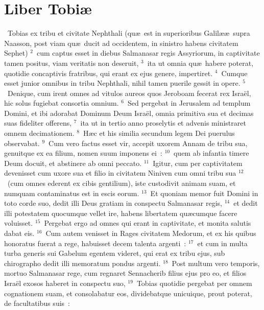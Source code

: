{\centering \section*{Liber Tobiæ}}\thispagestyle{empty}

~Tobias ex tribu et civitate Nephthali (qu\ae\ est in superioribus Galil\ae \ae\ supra Naasson, post viam qu\ae\ ducit ad occidentem, in sinistro habens civitatem Sephet)
${}^{2}$~cum captus esset in diebus Salmanasar regis Assyriorum, in captivitate tamen positus, viam veritatis non deseruit,
${}^{3}$~ita ut omnia qu\ae\ habere poterat, quotidie concaptivis fratribus, qui erant ex ejus genere, impertiret.
${}^{4}$~Cumque esset junior omnibus in tribu Nephthali, nihil tamen puerile gessit in opere.
${}^{5}$~Denique, cum irent omnes ad vitulos aureos quos Jeroboam fecerat rex Isra\"el, hic solus fugiebat consortia omnium.
${}^{6}$~Sed pergebat in Jerusalem ad templum Domini, et ibi adorabat Dominum Deum Isra\"el, omnia primitiva sua et decimas suas fideliter offerens,
${}^{7}$~ita ut in tertio anno proselytis et advenis ministraret omnem decimationem.
${}^{8}$~H\ae c et his similia secundum legem Dei puerulus observabat.
${}^{9}$~Cum vero factus esset vir, accepit uxorem Annam de tribu sua, genuitque ex ea filium, nomen suum imponens ei~:
${}^{10}$~quem ab infantia timere Deum docuit, et abstinere ab omni peccato.
${}^{11}$~Igitur, cum per captivitatem devenisset cum uxore sua et filio in civitatem Niniven cum omni tribu sua
${}^{12}$~(cum omnes ederent ex cibis gentilium), iste custodivit animam suam, et numquam contaminatus est in escis eorum.
${}^{13}$~Et quoniam memor fuit Domini in toto corde suo, dedit illi Deus gratiam in conspectu Salmanasar regis,
${}^{14}$~et dedit illi potestatem quocumque vellet ire, habens libertatem qu\ae cumque facere voluisset.
${}^{15}$~Pergebat ergo ad omnes qui erant in captivitate, et monita salutis dabat eis.
${}^{16}$~Cum autem venisset in Rages civitatem Medorum, et ex his quibus honoratus fuerat a rege, habuisset decem talenta argenti~:
${}^{17}$~et cum in multa turba generis sui Gabelum egentem videret, qui erat ex tribu ejus, sub chirographo dedit illi memoratum pondus argenti.
${}^{18}$~Post multum vero temporis, mortuo Salmanasar rege, cum regnaret Sennacherib filius ejus pro eo, et filios Isra\"el exosos haberet in conspectu suo,
${}^{19}$~Tobias quotidie pergebat per omnem cognationem suam, et consolabatur eos, dividebatque unicuique, prout poterat, de facultatibus suis~:
